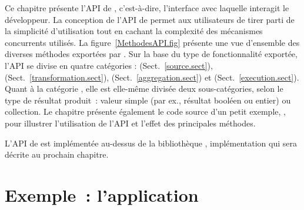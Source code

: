 





Ce chapitre pr\'esente l'API de \ppff,  c'est-\`a-dire, l'interface avec laquelle interagit le d\'eveloppeur. La conception de l'API de \ppff{} permet aux utilisateurs de tirer parti de la simplicit\'e d'utilisation tout en cachant la complexit\'e des m\'ecanismes concurrents utilis\'es. La figure~\ref{MethodesAPI.fig} pr\'esente une vue d'ensemble des diverses m\'ethodes export\'ees par \ppff. Sur la base du type de fonctionnalit\'e export\'ee, l'API se divise en quatre cat\'egories :   (Sect.~\ref{source.sect}),  (Sect.~\ref{transformation.sect}),   (Sect.~\ref{aggregation.sect}) et  (Sect.~\ref{execution.sect}). Quant \`a la cat\'egorie , elle est elle-m\^eme divis\'ee deux sous-cat\'egories, selon le type de r\'esultat produit~: valeur simple (par ex., r\'esultat bool\'een ou entier) ou collection.
%
%
Le chapitre pr\'esente \'egalement le code source d'un petit exemple, , pour illustrer l'utilisation de l'API et l'effet des principales m\'ethodes.

L'{API} de \PpFf{} est impl\'ement\'ee au-dessus de la biblioth\`eque , impl\'ementation qui sera d\'ecrite au prochain chapitre.



\section{Exemple~: l'application }
\label{descriptionWordCount.sect}




